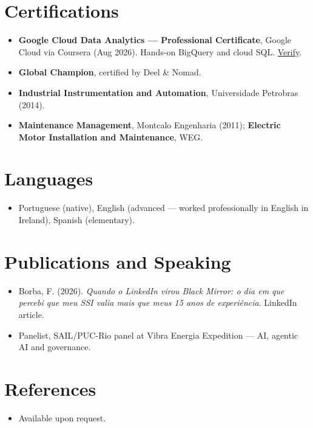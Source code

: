 \documentclass[11pt,a4paper,sans]{moderncv}
\begin{document}
\section{Certifications}
\vspace{1pt}
\begin{itemize}
\item {\textbf{Google Cloud Data Analytics --- Professional Certificate}, Google Cloud via Coursera (Aug 2026). Hands-on BigQuery and cloud SQL. \href{https://coursera.org/verify/professional-cert/I4UQOIC2RQ62}{Verify}.}
\item {\textbf{Global Champion}, certified by Deel \& Nomad.}
\item {\textbf{Industrial Instrumentation and Automation}, Universidade Petrobras (2014).}
\item {\textbf{Maintenance Management}, Montcalo Engenharia (2011); \textbf{Electric Motor Installation and Maintenance}, WEG.}
\end{itemize}


\section{Languages}
\vspace{1pt}
\begin{itemize}
\item {Portuguese (native), English (advanced --- worked professionally in English in Ireland), Spanish (elementary).}
\end{itemize}


\section{Publications and Speaking}
\vspace{1pt}
\begin{itemize}
\item {Borba, F. (2026). \emph{Quando o LinkedIn virou Black Mirror: o dia em que percebi que meu SSI valia mais que meus 15 anos de experi\^encia}. LinkedIn article.}
\item {Panelist, SAIL/PUC-Rio panel at Vibra Energia Expedition --- AI, agentic AI and governance.}
\end{itemize}


\section{References}
\vspace{1pt}
\begin{itemize}
\item{Available upon request.}
\end{itemize}
\end{document}
